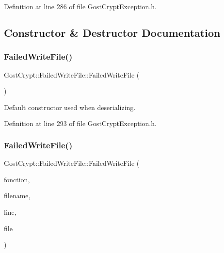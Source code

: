 Definition at line 286 of file Gost\+Crypt\+Exception.\+h.



\subsection{Constructor \& Destructor Documentation}
\mbox{\label{class_gost_crypt_1_1_failed_write_file_aa4dd5774c88569ea2c868b85af61ea3f}} 
\subsubsection{\texorpdfstring{Failed\+Write\+File()}{FailedWriteFile()}\hspace{0.1cm}{\footnotesize\ttfamily [1/2]}}
{\footnotesize\ttfamily Gost\+Crypt\+::\+Failed\+Write\+File\+::\+Failed\+Write\+File (\begin{DoxyParamCaption}{ }\end{DoxyParamCaption})\hspace{0.3cm}{\ttfamily [inline]}}



Default constructor used when deserializing. 



Definition at line 293 of file Gost\+Crypt\+Exception.\+h.

\mbox{\label{class_gost_crypt_1_1_failed_write_file_ae2eecc02373b2710df827e72a3226c26}} 
\subsubsection{\texorpdfstring{Failed\+Write\+File()}{FailedWriteFile()}\hspace{0.1cm}{\footnotesize\ttfamily [2/2]}}
{\footnotesize\ttfamily Gost\+Crypt\+::\+Failed\+Write\+File\+::\+Failed\+Write\+File (\begin{DoxyParamCaption}\item[{Q\+String}]{fonction,  }\item[{Q\+String}]{filename,  }\item[{quint32}]{line,  }\item[{Q\+File\+Info}]{file }\end{DoxyParamCaption})\hspace{0.3cm}{\ttfamily [inline]}}



